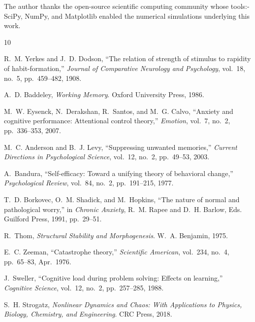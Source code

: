 The author thanks the open-source scientific computing community
whose tools:- SciPy, NumPy, and Matplotlib enabled the
numerical simulations underlying this work.

\begin{thebibliography}{10}

R.~M. Yerkes and J.~D. Dodson,
``The relation of strength of stimulus to rapidity of
habit-formation,''
\textit{Journal of Comparative Neurology and Psychology},
vol.~18, no.~5, pp.~459--482, 1908.

A.~D. Baddeley,
\textit{Working Memory}.
Oxford University Press, 1986.

M.~W. Eysenck, N.~Derakshan, R.~Santos, and M.~G. Calvo,
``Anxiety and cognitive performance: Attentional control theory,''
\textit{Emotion}, vol.~7, no.~2, pp.~336--353, 2007.

M.~C. Anderson and B.~J. Levy,
``Suppressing unwanted memories,''
\textit{Current Directions in Psychological Science},
vol.~12, no.~2, pp.~49--53, 2003.

A.~Bandura,
``Self-efficacy: Toward a unifying theory of behavioral change,''
\textit{Psychological Review}, vol.~84, no.~2, pp.~191--215, 1977.

T.~D. Borkovec, O.~M. Shadick, and M.~Hopkins,
``The nature of normal and pathological worry,''
in \textit{Chronic Anxiety}, R.~M. Rapee and D.~H. Barlow, Eds.
Guilford Press, 1991, pp.~29--51.

R.~Thom,
\textit{Structural Stability and Morphogenesis}.
W.~A. Benjamin, 1975.

E.~C. Zeeman,
``Catastrophe theory,''
\textit{Scientific American}, vol.~234, no.~4, pp.~65--83,
Apr.\ 1976.

J.~Sweller,
``Cognitive load during problem solving: Effects on learning,''
\textit{Cognitive Science}, vol.~12, no.~2, pp.~257--285, 1988.

S.~H. Strogatz,
\textit{Nonlinear Dynamics and Chaos: With Applications to Physics,
Biology, Chemistry, and Engineering}.
CRC Press, 2018.

\end{thebibliography}



